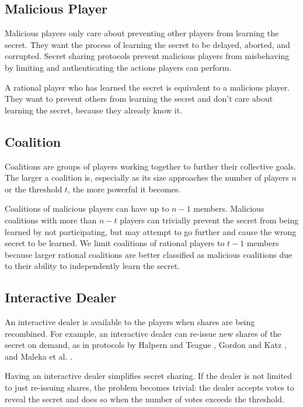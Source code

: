 \documentclass{dalcsthesis}
\begin{document}
\subsection{Malicious Player}

Malicious players only care about preventing other players from learning the secret. They want the process of learning the secret to be delayed, aborted, and corrupted. Secret sharing protocols prevent malicious players from misbehaving by limiting and authenticating the actions players can perform.

A rational player who has learned the secret is equivalent to a malicious player. They want to prevent others from learning the secret and don't care about learning the secret, because they already know it.

\subsection{Coalition}

Coalitions are groups of players working together to further their collective goals. The larger a coalition is, especially as its size approaches the number of players $n$ or the threshold $t$, the more powerful it becomes.

Coalitions of malicious players can have up to $n-1$ members. Malicious coalitions with more than $n-t$ players can trivially prevent the secret from being learned by not participating, but may attempt to go further and cause the wrong secret to be learned. We limit coalitions of rational players to $t-1$ members because larger rational coalitions are better classified as malicious coalitions due to their ability to independently learn the secret.

\subsection{Interactive Dealer}

An interactive dealer is available to the players when shares are being recombined. For example, an interactive dealer can re-issue new shares of the secret on demand, as in protocols by Halpern and Teague \cite{halpern04}, Gordon and Katz \cite{gordon06}, and Maleka et al. \cite{maleka08}.

Having an interactive dealer simplifies secret sharing. If the dealer is not limited to just re-issuing shares, the problem becomes trivial: the dealer accepts votes to reveal the secret and does so when the number of votes exceeds the threshold.
\end{document}
